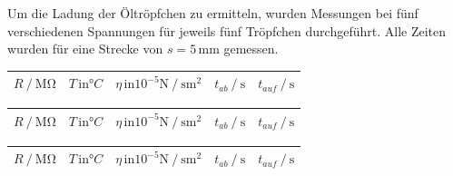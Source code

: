 Um die Ladung der Öltröpfchen zu ermitteln, wurden Messungen bei fünf verschiedenen Spannungen für jeweils fünf Tröpfchen durchgeführt.
Alle Zeiten wurden für eine Strecke von $s = 5 \, \unit{\milli\meter}$ gemessen.
\begin{table}[H]
    \caption{Messdaten der Öltröpfchen für verschiedene Spannungen}
    \label{tab:v_werte}
    \centering
    \begin{minipage}[t]{1\textwidth}
        \small
        \label{stab:v157}
        \begin{table}[H]
            \centering
            \begin{tabular}{S S S S S}
              \toprule
                {$R \mathbin{/} \unit{\mega\ohm} $}& {$T \, \text{in} °C $} & {$\eta \, \text{in} 10^{-5} \unit{\newton}\mathbin{/} \unit{\second\meter}^2$} & {$ t_{ab} \mathbin{/} \unit{\second}$} & {$ t_{auf} \mathbin{/} \unit{\second}$}\\
              \midrule
              
              \bottomrule
            \end{tabular}
          \end{table}
        
    \end{minipage}\qquad
    \begin{minipage}[t]{1\textwidth}
        \small
        \label{stab:v175}
        \begin{table}[H]
            \centering
            \begin{tabular}{S S S S S}
              \toprule
                {$R \mathbin{/} \unit{\mega\ohm} $} & {$T \, \text{in} °C $} & {$\eta \, \text{in} 10^{-5} \unit{\newton}\mathbin{/} \unit{\second\meter}^2$}&{$ t_{ab} \mathbin{/} \unit{\second}$} & {$ t_{auf} \mathbin{/} \unit{\second}$}\\
              \midrule
              
              \bottomrule
            \end{tabular}
          \end{table}
        
    \end{minipage}\qquad
    \begin{minipage}[t]{1\textwidth}
        \small
        \label{stab:v200}
        \begin{table}[H]
            \centering
            \begin{tabular}{S S S S S}
              \toprule
                {$R \mathbin{/} \unit{\mega\ohm} $} & {$T \, \text{in} °C $} & {$\eta \, \text{in} 10^{-5} \unit{\newton}\mathbin{/} \unit{\second\meter}^2$}&{$ t_{ab} \mathbin{/} \unit{\second}$} & {$ t_{auf} \mathbin{/} \unit{\second}$}\\
              \midrule
              

\end{tabular}
\end{table}
\end{minipage}
\end{table}
